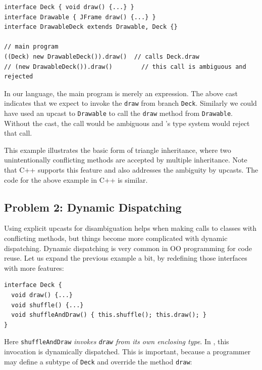 \vspace{3pt}\begin{lstlisting}
interface Deck { void draw() {...} }
interface Drawable { JFrame draw() {...} }
interface DrawableDeck extends Drawable, Deck {}

// main program
((Deck) new DrawableDeck()).draw()  // calls Deck.draw
// (new DrawableDeck()).draw()        // this call is ambiguous and rejected
\end{lstlisting}\vspace{3pt}
In our language, the main program is merely an expression. The above cast indicates
that we expect to invoke the \lstinline|draw| from branch
\lstinline|Deck|. Similarly we could have used an upcast to \lstinline|Drawable|
to call the \lstinline|draw| method from \lstinline|Drawable|.
Without the cast, the call would be ambiguous and
\MIM{}'s type system would reject that call. 

This example illustrates the basic form of triangle inheritance, where two unintentionally conflicting methods
are accepted by multiple inheritance. Note that C++ supports this feature and also addresses the
ambiguity by upcasts. The code for the above example in C++ is similar. 


\subsection{Problem 2: Dynamic Dispatching}\label{subsec:problem2}
Using explicit upcasts for disambiguation helps when making calls to
classes with conflicting methods, but things
become more complicated with dynamic dispatching. Dynamic
dispatching is very common in OO programming for code reuse. Let us expand the previous
example a bit, by redefining those interfaces with more features:

\vspace{3pt}\begin{lstlisting}
interface Deck {
  void draw() {...}
  void shuffle() {...}
  void shuffleAndDraw() { this.shuffle(); this.draw(); }
}
\end{lstlisting}\vspace{3pt}
Here \lstinline|shuffleAndDraw| \emph{invokes \lstinline|draw| from its own enclosing type}. In \MIM{}, this invocation is dynamically dispatched. This is important, because a programmer may define a subtype
of \lstinline|Deck| and override the method \lstinline|draw|:

